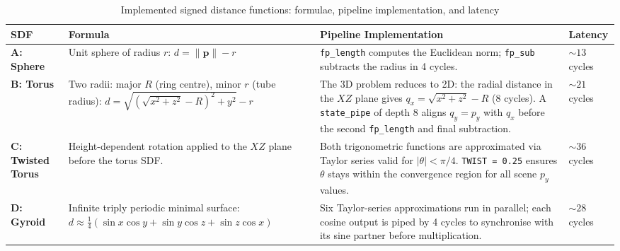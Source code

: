 \FloatBarrier                                                                                                             
                                                                                                                            
  \begin{table}[h]                                                                                                          
  \centering                                                                                                                
  \caption{Implemented signed distance functions: formulae, pipeline implementation, and latency}                           
  \label{tab:sdfs}
  \setlength{\arrayrulewidth}{0.4mm}
  \renewcommand{\arraystretch}{1.4}
  \begin{tabular}{|p{2.4cm}|p{4.2cm}|p{5.8cm}|p{2.0cm}|}
  \hline
  \textbf{SDF} & \textbf{Formula} & \textbf{Pipeline Implementation} & \textbf{Latency} \\
  \hline\hline

  \textbf{A: Sphere}
  &
  Unit sphere of radius $r$:
  $d = \|\mathbf{p}\| - r$
  &
  \texttt{fp\_length} computes the Euclidean norm; \texttt{fp\_sub} subtracts the radius in 4 cycles.
  &
  ${\sim}13$ cycles \\
  \hline

  \textbf{B: Torus}
  &
  Two radii: major $R$ (ring centre), minor $r$ (tube radius):
  $d = \sqrt{(\sqrt{x^2+z^2}-R)^2+y^2} - r$
  &
  The 3D problem reduces to 2D: the radial distance in the $XZ$ plane gives $q_x = \sqrt{x^2+z^2} - R$ (8 cycles). A
  \texttt{state\_pipe} of depth 8 aligns $q_y = p_y$ with $q_x$ before the second \texttt{fp\_length} and final subtraction.
  &
  ${\sim}21$ cycles \\
  \hline

  \textbf{C: Twisted Torus}
  &
  Height-dependent rotation applied to the $XZ$ plane before the torus SDF.
  &
  Both trigonometric functions are approximated via Taylor series valid for $|\theta| < \pi/4$. \texttt{TWIST = 0.25}
  ensures $\theta$ stays within the convergence region for all scene $p_y$ values.
  &
  ${\sim}36$ cycles \\
  \hline

  \textbf{D: Gyroid}
  &
  Infinite triply periodic minimal surface:
  $d \approx \tfrac{1}{4}(\sin x\cos y + \sin y\cos z + \sin z\cos x)$
  &
  Six Taylor-series approximations run in parallel; each cosine output is piped by 4 cycles to synchronise with its sine
  partner before multiplication.
  &
  ${\sim}28$ cycles \\
  \hline


\end{tabular}
\end{table}

